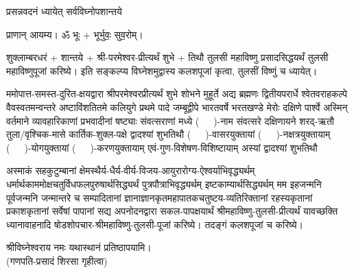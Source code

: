 
\setlength{\parindent}{0pt}




{प्रसन्नवदनं ध्यायेत् सर्वविघ्नोपशान्तये}

प्राणान्  आयम्य।  ॐ भूः + भूर्भुवः॒ सुव॒रोम्।


शुक्लाम्बरधरं + शान्तये + श्री-परमेश्वर-प्रीत्यर्थं शुभे + तिथौ तुलसी महाविष्णु प्रसादसिद्धयर्थं तुलसी महाविष्णुपूजां करिष्ये।
इति सङ्कल्प्य विघ्नेशमुद्वास्य कलशपूजां कृत्वा, तुलसीं विष्णुं च ध्यायेत्। 



ममोपात्त-समस्त-दुरित-क्षयद्वारा श्रीपरमेश्वर\-प्रीत्यर्थं शुभे शोभने मुहूर्ते अद्य ब्रह्मणः
द्वितीयपरार्धे श्वेतवराहकल्पे वैवस्वतमन्वन्तरे अष्टाविंशतितमे कलियुगे प्रथमे पादे
जम्बूद्वीपे भारतवर्षे भरत\-खण्डे मेरोः दक्षिणे पार्श्वे अस्मिन् वर्तमाने व्यावहारिकाणां
प्रभवादीनां षष्ट्याः संवत्सराणां मध्ये \mbox{(~~~)}-नाम संवत्सरे दक्षिणायने 
{शरद्}-ऋतौ  {तुला/वृश्चिक}-मासे कार्तिक-शुक्ल-पक्षे द्वादश्यां शुभतिथौ
\mbox{(~~~)}-वासरयुक्तायां 
\mbox{(~~~)}-नक्षत्र\-युक्तायाम्
\mbox{(~~~)}-योग\-युक्तायां
\mbox{(~~~)}-करण\-युक्तायाम् एवं-गुण-विशेषण-विशिष्टायाम् अस्यां द्वादश्यां शुभतिथौ 

अस्माकं सहकुटुम्बानां क्षेमस्थैर्य-धैर्य-वीर्य-विजय-आयुरारोग्य-ऐश्वर्याभि\-वृद्ध्यर्थम्
धर्मार्थ\-काम\-मोक्ष\-चतुर्विध\-फलपुरुषार्थ\-सिद्ध्यर्थं पुत्रपौत्राभि\-वृद्ध्यर्थम् इष्टकाम्यार्थ\-सिद्ध्यर्थम्
मम इहजन्मनि पूर्वजन्मनि जन्मान्तरे च सम्पादितानां ज्ञानाज्ञानकृतमहा\-पातकचतुष्टय-व्यतिरिक्तानां रहस्यकृतानां प्रकाश\-कृतानां सर्वेषां पापानां सद्य अपनोदन\-द्वारा सकल-पाप\-क्षयार्थं श्री\-महाविष्णु-तुलसी-प्रीत्यर्थं यावच्छक्ति ध्यानावाहनादि षोडशोपचार-श्रीमहाविष्णु-तुलसी-पूजां करिष्ये। तदङ्गं कलशपूजां च करिष्ये।


श्रीविघ्नेश्वराय नमः यथास्थानं प्रतिष्ठापयामि।\\
(गणपति-प्रसादं शिरसा गृहीत्वा)













